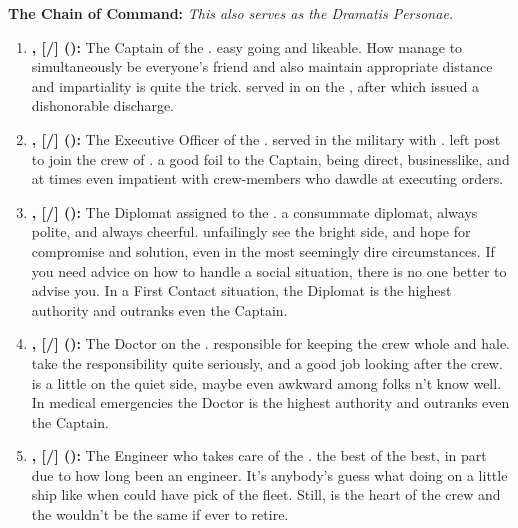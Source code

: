 \documentclass[blue]{TMFHope}
\begin{document}
{\bf The \pNew{} Chain of Command:} \emph{This also serves as the Dramatis Personae.}
\begin{enumerate}
  \item \textbf{\cCap{\full}, [\cCap{\they}/\cCap{\them}] (\cCap{\MYplayer}):} The Captain of the \pNew{}. \cCap{\They} \cCap{\are} easy going and likeable. How \cCap{\they} manage\cCap{\plural} to simultaneously be everyone's friend and also maintain appropriate distance and impartiality is quite the trick. \cCap{\They} served in \pBattle{} on the \pOld{}, after which \cCap{\they} \cCap{\were} issued a dishonorable discharge.
  
  \item \textbf{\cXO{\full}, [\cXO{\they}/\cXO{\them}] (\cXO{\MYplayer}):} The Executive Officer of the \pNew{}. \cXO{} served in the \pPlan{} military with \cCap{}. \cXO{\They} left \cXO{\their} post to join the crew of \pNew{}. \cXO{\They} \cXO{\are} a good foil to the Captain, being direct, businesslike, and at times even impatient with crew-members who dawdle at executing orders.
  
  \item \textbf{\cDip{\full}, [\cDip{\they}/\cDip{\them}] (\cDip{\MYplayer}):} The Diplomat assigned to the \pNew{}. \cDip{\They} \cDip{\are} a consummate diplomat, always polite, and always cheerful. \cDip{\They} unfailingly see\cDip{\plural} the bright side, and \cDip{\have} hope for compromise and solution, even in the most seemingly dire circumstances. If you need advice on how to handle a social situation, there is no one better to advise you. In a First Contact situation, the Diplomat is the highest authority and outranks even the Captain.
  
  \item \textbf{\cMed{\full}, [\cMed{\they}/\cMed{\them}] (\cMed{\MYplayer}):} The Doctor on the \pNew{}. \cMed{\They} \cMed{\are} responsible for keeping the crew whole and hale. \cMed{\They} take\cMed{\plural} the responsibility quite seriously, and \cMed{\does} a good job looking after the crew. \cMed{} is a little on the quiet side, maybe even awkward among folks \cMed{\they} \cMed{\does}n't know well. In medical emergencies the Doctor is the highest authority and outranks even the Captain.
  
  \item \textbf{\cEng{\full}, [\cEng{\they}/\cEng{\them}] (\cEng{\MYplayer}):} The Engineer who takes care of the \pNew{}. \cEng{\They} \cEng{\are} the best of the best, in part due to how long \cEng{\they} \cEng{\have} been an engineer. It's anybody's guess what \cEng{\they} \cEng{\are} doing on a little ship like \pNew{} when \cEng{\they} could have \cEng{\their} pick of the fleet. Still, \cEng{} is the heart of the crew and the \pNew{} wouldn't be the same if \cEng{\they} \cEng{\were} ever to retire.
  

\end{enumerate}
\end{document}
